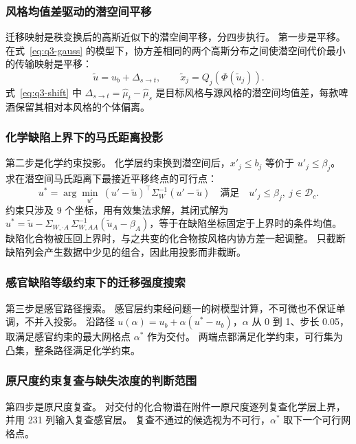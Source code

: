 \subsubsection{风格均值差驱动的潜空间平移}

迁移映射是秩变换后的高斯近似下的潜空间平移，分四步执行。
第一步是平移。
在式~\eqref{eq:q3-gauss} 的模型下，协方差相同的两个高斯分布之间使潜空间代价最小的传输映射是平移：
\begin{equation}\label{eq:q3-shift}
\tilde u=u_b+\Delta_{s\to t},\qquad \tilde x_j=Q_j(\Phi(\tilde u_j)) .
\end{equation}
式~\eqref{eq:q3-shift} 中 $\Delta_{s\to t}=\hat\mu_t-\hat\mu_s$ 是目标风格与源风格的潜空间均值差，每款啤酒保留其相对本风格的个体偏离。

\subsubsection{化学缺陷上界下的马氏距离投影}

第二步是化学约束投影。
化学层约束换到潜空间后，$x'_j\le b_j$ 等价于 $u'_j\le\beta_j$。
求在潜空间马氏距离下最接近平移终点的可行点：
\begin{equation}\label{eq:q3-proj}
u^*=\arg\min_{u'}\ (u'-\tilde u)^\top\Sigma_W^{-1}(u'-\tilde u)\quad\text{满足}\quad u'_j\le\beta_j,\ j\in\mathcal D_c .
\end{equation}
约束只涉及 9 个坐标，用有效集法求解，其闭式解为 $u^*=\tilde u-\Sigma_{W,\cdot A}\,\Sigma_{W,AA}^{-1}(\tilde u_A-\beta_A)$，等于在缺陷坐标固定于上界时的条件均值。
缺陷化合物被压回上界时，与之共变的化合物按风格内协方差一起调整。
只截断缺陷列会产生数据中少见的组合，因此用投影而非截断。

\subsubsection{感官缺陷等级约束下的迁移强度搜索}

第三步是感官路径搜索。
感官层约束经问题一的树模型计算，不可微也不保证单调，不并入投影。
沿路径 $u(\alpha)=u_b+\alpha(u^*-u_b)$，$\alpha$ 从 0 到 1、步长 0.05，取满足感官约束的最大网格点 $\alpha^*$ 作为交付。
两端点都满足化学约束，可行集为凸集，整条路径满足化学约束。

\subsubsection{原尺度约束复查与缺失浓度的判断范围}

第四步是原尺度复查。
对交付的化合物谱在附件一原尺度逐列复查化学层上界，并用 231 列输入复查感官层。
复查不通过的候选视为不可行，$\alpha^*$ 取下一个可行网格点。

